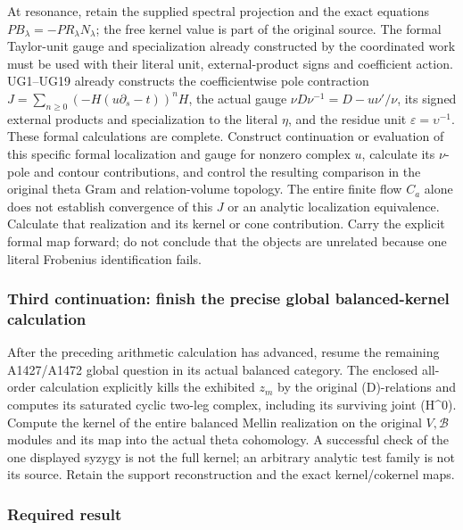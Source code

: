 
At resonance, retain the supplied spectral projection and the exact
equations \(PB_\lambda=-PR_\lambda N_\lambda\); the free kernel value is
part of the original source. The formal Taylor-unit gauge and
specialization already constructed by the coordinated work must be used
with their literal unit, external-product signs and coefficient action.
UG1--UG19 already constructs the coefficientwise pole contraction
\(J=\sum_{n\ge0}(-H(u\partial_s-t))^nH\), the actual gauge
\(\nu D\nu^{-1}=D-u\nu'/\nu\), its signed external products and
specialization to the literal \(\eta\), and the residue unit
\(\varepsilon=\upsilon^{-1}\). These formal calculations are complete.
Construct continuation or evaluation of this specific formal
localization and gauge for nonzero complex \(u\), calculate its
\(\nu\)-pole and contour contributions, and control the resulting
comparison in the original theta Gram and relation-volume topology. The
entire finite flow \(C_a\) alone does not establish convergence of this
\(J\) or an analytic localization equivalence. Calculate that
realization and its kernel or cone contribution. Carry the explicit
formal map forward; do not conclude that the objects are unrelated
because one literal Frobenius identification fails.

\subsubsection{Third continuation: finish the precise global
balanced-kernel
calculation}\label{third-continuation-finish-the-precise-global-balanced-kernel-calculation}

After the preceding arithmetic calculation has advanced, resume the
remaining A1427/A1472 global question in its actual balanced category.
The enclosed all-order calculation explicitly kills the exhibited
\(z_m\) by the original (D)-relations and computes its saturated cyclic
two-leg complex, including its surviving joint (H\^{}0). Compute the
kernel of the entire balanced Mellin realization on the original
\(V,\mathscr B\) modules and its map into the actual theta cohomology. A
successful check of the one displayed syzygy is not the full kernel; an
arbitrary analytic test family is not its source. Retain the support
reconstruction and the exact kernel/cokernel maps.

\subsubsection{Required result}\label{required-result}

